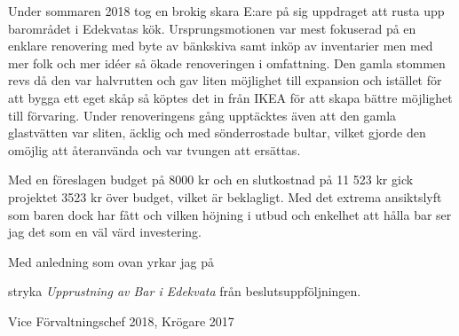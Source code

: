 \documentclass[../_main/handlingar.tex]{subfiles}
\begin{document}
Under sommaren 2018 tog en brokig skara E:are på sig uppdraget att rusta upp barområdet i Edekvatas kök. Ursprungsmotionen var mest fokuserad på en enklare renovering med byte av bänkskiva samt inköp av inventarier men med mer folk och mer idéer så ökade renoveringen i omfattning. Den gamla stommen revs då den var halvrutten och gav liten möjlighet till expansion och istället för att bygga ett eget skåp så köptes det in från IKEA för att skapa bättre möjlighet till förvaring. Under renoveringens gång upptäcktes även att den gamla glastvätten var sliten, äcklig och med sönderrostade bultar, vilket gjorde den omöjlig att återanvända och var tvungen att ersättas.

Med en föreslagen budget på 8000 kr och en slutkostnad på 11 523 kr gick projektet 3523 kr över budget, vilket är beklagligt. Med det extrema ansiktslyft som baren dock har fått och vilken höjning i utbud och enkelhet att hålla bar ser jag det som en väl värd investering.

Med anledning som ovan yrkar jag på
\begin{attsatser}
    \att stryka \emph{Upprustning av Bar i Edekvata} från beslutsuppföljningen.
\end{attsatser}

\begin{signatures}{1}
    \mvh
	\signature{Markus Rahne}{Vice Förvaltningschef 2018, Krögare 2017}
\end{signatures}
\end{document}
